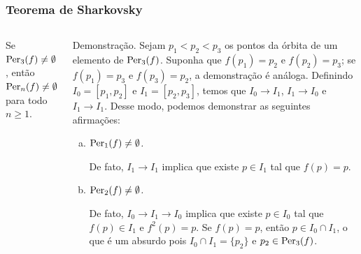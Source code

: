 \begin{frame}
\vspace{5pt}
\frametitle{Teorema de Sharkovsky}
\begin{columns}
\column{\dimexpr\paperwidth-15pt}

\begin{theorem}\label{teo 9-2}
Se $\operatorname{Per}_3(f) \neq \emptyset$, então $\operatorname{Per}_n(f) \neq \emptyset$ para todo $n \geq 1$.
\end{theorem}

\begin{block}{Demonstração.}
Sejam $p_1 < p_2 < p_3$ os pontos da órbita de um elemento de $\operatorname{Per}_3(f)$. Suponha que $f(p_1) = p_2$ e $f(p_2) = p_3$; se $f(p_1) = p_3$ e $f(p_3) = p_2$, a demonstração é análoga.
Definindo $I_0 = [p_1, p_2]$ e $I_1 = [p_2, p_3]$, temos que $I_0 \longrightarrow I_1$, $I_1 \longrightarrow I_0$ e $I_1 \longrightarrow I_1$. Desse modo, podemos demonstrar as seguintes afirmações:

\begin{enumerate}[a)]
\item \textit{$\operatorname{Per}_1(f) \neq \emptyset$.}

De fato, $I_1 \longrightarrow I_1$ implica que existe $p \in I_1$ tal que $f(p) = p$.

\item \textit{$\operatorname{Per}_2(f) \neq \emptyset$.}

De fato, $I_0 \longrightarrow I_1 \longrightarrow I_0$ implica que existe $p \in I_0$ tal que $f(p) \in I_1$ e $f^2(p) = p$.
Se $f(p) = p$, então $p \in I_0 \cap I_1$, o que é um absurdo pois $I_0 \cap I_1 = \lbrace p_2 \rbrace$ e $p_2 \in \operatorname{Per}_3(f)$.
\end{enumerate}
\end{block}

\end{columns}
\end{frame}


